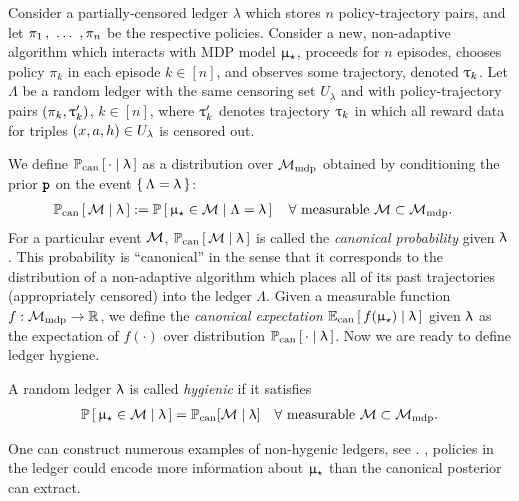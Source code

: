 Consider a partially-censored ledger $\lambda$ which stores $n$ policy-trajectory pairs, and let $\pi_1 \, ,\ \ldots\ , \pi_n$ be the respective policies. Consider a new, non-adaptive algorithm which interacts with MDP model $\upmu_{\star}$, proceeds for $n$ episodes, chooses policy $\pi_k$ in each episode $k\in [n]$, and observes some trajectory, denoted ${\uptau}_k$. Let $\Lambda$ be a random ledger with the same censoring set $U_\lambda$ and with policy-trajectory pairs
    $(\pi_k,{\uptau}'_k)$, $k\in[n]$,
where ${\uptau}'_k$ denotes trajectory ${\uptau}_k$ in which all reward data for triples $(x,a,h)\in U_\lambda$ is censored out.


We define $\operatorname{\mathbb{P}}_{\mathrm{can}}\left[\, \cdot \mid \uplambda \,\right]$ as a distribution over $\mathcal{M}_{\mathrm{mdp}}$ obtained  by conditioning the prior ${\normalfont \texttt{\textbf{p}}}$ on the event
$\left\{\,\Lambda = \uplambda\,\right\}$:
\begin{align}\label{eq:canon-posterior-defn}
\Prcan\sbr{\modclass \mid \ledger }
    &:= \Prop \sbr{ \modst \in \modclass \mid \Lambda = \ledger }
    \quad\forall \text{ measurable }\modclass\subset\modtotal.
\end{align}
For a particular event $\mathcal{M}$,
    $\operatorname{\mathbb{P}}_{\mathrm{can}}\left[\,\mathcal{M} \mid \uplambda \,\right]$
is called the \emph{canonical probability} given $\uplambda$. This probability is ``canonical'' in the sense that it corresponds to the distribution of a non-adaptive algorithm which places all of its past trajectories (appropriately censored) into the ledger $\Lambda$. Given a measurable function $f:\mathcal{M}_{\mathrm{mdp}}\to \mathbb{R}$, we define the \emph{canonical expectation}
    $\mathbb{E}_{\mathrm{can}}\left[\,f(\upmu_{\star})\mid \uplambda\,\right]$
given $\uplambda$ as the expectation of $f(\cdot)$ over distribution $\operatorname{\mathbb{P}}_{\mathrm{can}}\left[\, \cdot \mid \uplambda \,\right]$.
Now we are ready to define ledger hygiene.

\begin{definition}\label{def:hygiene}
A random ledger $\uplambda$ is called \emph{hygienic} if it satisfies
\begin{align}\label{eq:hygiene}
 \operatorname{\mathbb{P}}\left[\,\upmu_{\star} \in \mathcal{M} \mid \uplambda\,\right]  = \operatorname{\mathbb{P}}_{\mathrm{can}}[\mathcal{M} \mid \uplambda ]
 \quad\forall \text{ measurable }\mathcal{M}\subset\mathcal{M}_{\mathrm{mdp}}.
\end{align}
\end{definition}

One can construct numerous examples of non-hygenic ledgers, see . \Eg, policies in the ledger could encode more information about $\upmu_{\star}$ than the canonical posterior can extract.

